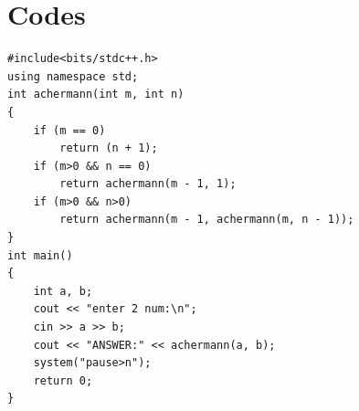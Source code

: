 \documentclass{article}
\begin{document}
\section{Codes}
\begin{lstlisting}
#include<bits/stdc++.h>
using namespace std;
int achermann(int m, int n)
{
	if (m == 0)
		return (n + 1);
	if (m>0 && n == 0)
		return achermann(m - 1, 1);
	if (m>0 && n>0)
		return achermann(m - 1, achermann(m, n - 1));
}
int main()
{
	int a, b;
	cout << "enter 2 num:\n";
	cin >> a >> b;
	cout << "ANSWER:" << achermann(a, b);
	system("pause>n");
	return 0;
}
\end{lstlisting}
\end{document}
